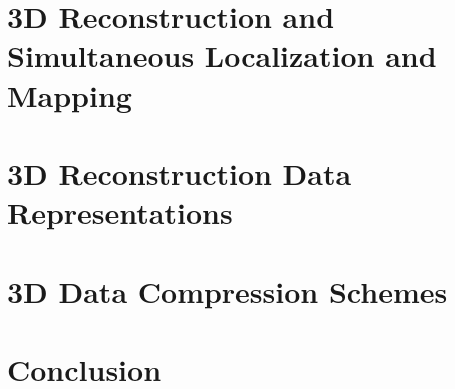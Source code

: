 \section{3D Reconstruction and Simultaneous Localization and Mapping}



\section{3D Reconstruction Data Representations}

\section{3D Data Compression Schemes}




\section{Conclusion}

